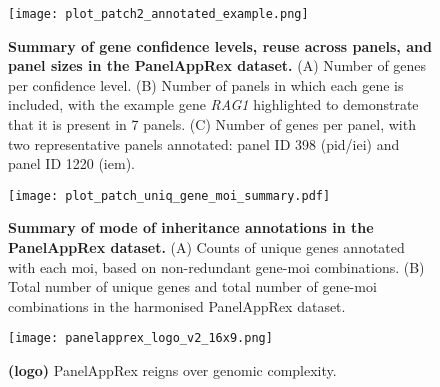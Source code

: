 \begin{figure}[ht]
    \centering
    \texttt{[image: plot\_patch2\_annotated\_example.png]}    
\caption{\textbf{Summary of gene confidence levels, reuse across panels, and panel sizes in the PanelAppRex dataset.}
(A) Number of genes per confidence level. 
(B) Number of panels in which each gene is included, with the example gene \textit{RAG1} highlighted to demonstrate that it is present in 7 panels. 
(C) Number of genes per panel, with two representative panels annotated: panel ID 398 (\ac{pid}/\ac{iei}) and panel ID 1220 (\ac{iem}).
}
    \label{fig:summary_stats}
\end{figure}


\begin{figure}[ht]
    \centering
    \texttt{[image: plot\_patch\_uniq\_gene\_moi\_summary.pdf]}
\caption{\textbf{Summary of mode of inheritance annotations in the PanelAppRex dataset.}
(A) Counts of unique genes annotated with each \ac{moi}, based on non-redundant gene-\ac{moi} combinations.
(B) Total number of unique genes and total number of gene-\ac{moi} combinations in the harmonised PanelAppRex dataset.
}
    \label{fig:uniq_gene_moi}
\end{figure}

\begin{figure}[ht]
    \centering
    \texttt{[image: panelapprex\_logo\_v2\_16x9.png]}
\caption{\textbf{(logo)} PanelAppRex reigns over genomic complexity.
}
    \label{fig:uniq_gene_moi}
\end{figure}

\FloatBarrier
\clearpage





